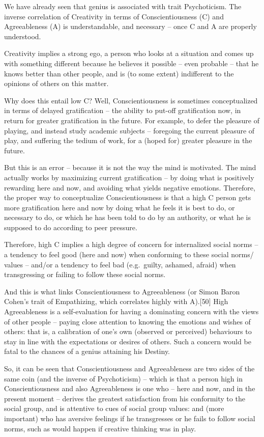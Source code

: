 \documentclass[
]{book}
\begin{document}
We have already seen that genius is associated with trait Psychoticism. The inverse correlation of Creativity in terms of Conscientiousness (C) and Agreeableness (A) is understandable, and necessary -- once C and A are properly understood.

Creativity implies a strong ego, a person who looks at a situation and comes up with something different because he believes it possible -- even probable -- that he knows better than other people, and is (to some extent) indifferent to the opinions of others on this matter.

Why does this entail low C? Well, Conscientiousness is sometimes conceptualized in terms of delayed gratification -- the ability to put-off gratification now, in return for greater gratification in the future. For example, to defer the pleasure of playing, and instead study academic subjects -- foregoing the current pleasure of play, and suffering the tedium of work, for a (hoped for) greater pleasure in the future.

But this is an error -- because it is not the way the mind is motivated. The mind actually works by maximizing current gratification -- by doing what is positively rewarding here and now, and avoiding what yields negative emotions. Therefore, the proper way to conceptualize Conscientiousness is that a high C person gets more gratification here and now by doing what he feels it is best to do, or necessary to do, or which he has been told to do by an authority, or what he is supposed to do according to peer pressure.

Therefore, high C implies a high degree of concern for internalized social norms -- a tendency to feel good (here and now) when conforming to these social norms/ values -- and/or a tendency to feel bad (e.g.~guilty, ashamed, afraid) when transgressing or failing to follow these social norms.

And this is what links Conscientiousness to Agreeableness (or Simon Baron Cohen's trait of Empathizing, which correlates highly with A).{[}50{]} High Agreeableness is a self-evaluation for having a dominating concern with the views of other people -- paying close attention to knowing the emotions and wishes of others: that is, a calibration of one's own (observed or perceived) behaviours to stay in line with the expectations or desires of others. Such a concern would be fatal to the chances of a genius attaining his Destiny.

So, it can be seen that Conscientiousness and Agreeableness are two sides of the same coin (and the inverse of Psychoticism) -- which is that a person high in Conscientiousness and also Agreeableness is one who -- here and now, and in the present moment -- derives the greatest satisfaction from his conformity to the social group, and is attentive to cues of social group values: and (more important) who has aversive feelings if he transgresses or he fails to follow social norms, such as would happen if creative thinking was in play.
\end{document}
